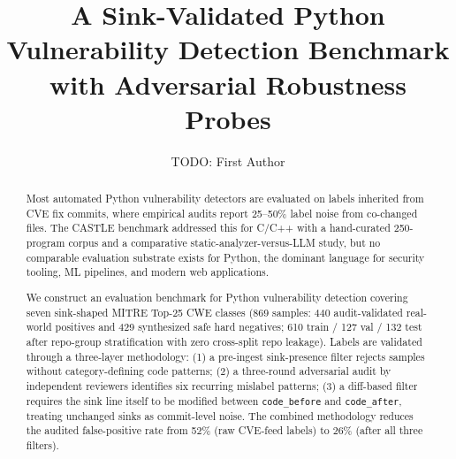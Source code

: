 \documentclass[3p,12pt]{elsarticle}
\begin{document}
\begin{frontmatter}

\title{A Sink-Validated Python Vulnerability Detection Benchmark with Adversarial Robustness Probes}

\author[inst1]{TODO: First Author}



\begin{abstract}
Most automated Python vulnerability detectors are evaluated on labels
inherited from CVE fix commits, where empirical audits report 25--50\%
label noise from co-changed files. The CASTLE benchmark addressed this
for C/C++ with a hand-curated 250-program corpus and a comparative
static-analyzer-versus-LLM study, but no comparable evaluation substrate
exists for Python, the dominant language for security tooling, ML
pipelines, and modern web applications.

We construct an evaluation benchmark for Python vulnerability detection
covering seven sink-shaped MITRE Top-25 CWE classes (869 samples:
440 audit-validated real-world positives and 429 synthesized safe hard
negatives; 610 train / 127 val / 132 test after
repo-group stratification with zero cross-split repo leakage). Labels are
validated through a three-layer methodology: (1) a pre-ingest
sink-presence filter rejects samples without category-defining code
patterns; (2) a three-round adversarial audit by independent reviewers
identifies six recurring mislabel patterns; (3) a diff-based filter
requires the sink line itself to be modified between \texttt{code\_before}
and \texttt{code\_after}, treating unchanged sinks as commit-level noise.
The combined methodology reduces the audited false-positive rate from
52\% (raw CVE-feed labels) to 26\% (after all three filters).


\end{abstract}
\end{frontmatter}
\end{document}
